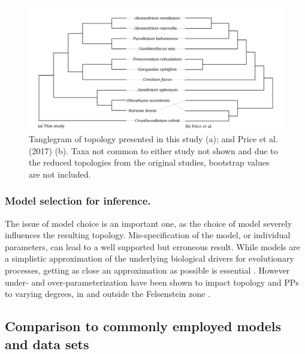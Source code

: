 \documentclass[12pt]{article}
\begin{document}
\begin{figure} 
\includegraphics[scale=.23]{figures/Price-comparison.png}
\caption{Tanglegram of topology presented in this study (a); and Price et al. (2017) (b). Taxa not common to either study not shown and due to the reduced topologies from the original studies, bootstrap values are not included.} 
\label{fig:tangle}
\end{figure} 
\FloatBarrier
\subsubsection*{Model selection for inference.} The issue of model choice is an important one, as the choice of model severely influences the resulting topology. 
Mis-specification of the model, or individual parameters, can lead to a well supported but erroneous result. 
While models are a simplistic approximation of the underlying biological drivers for evolutionary processes, getting as close an approximation as possible is essential \cite{box1979all}. 
However under- and over-parameterization have been shown to impact topology and PPs to varying degrees, in and outside the Felsenstein zone \cite{lemmon2004importance}. 

\subsection*{Comparison to commonly employed models and data sets}
\end{document}
